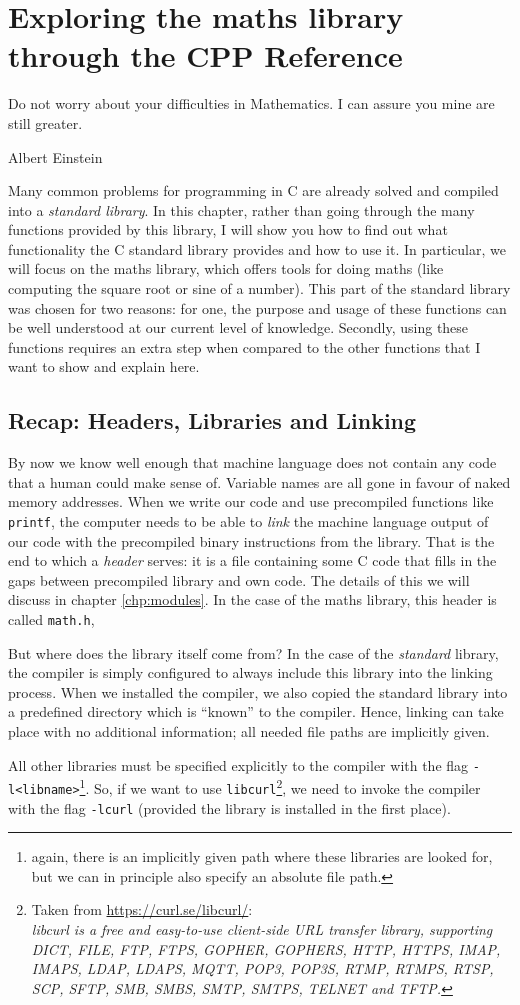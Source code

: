 \chapter{Exploring the maths library through the CPP Reference}\label{chp:maths}
\epigraph{Do not worry about your difficulties in Mathematics. I can assure you mine are still greater.}{Albert Einstein}

Many common problems for programming in C are already solved and compiled into a \emph{standard library}. In this chapter, rather than going through the many functions provided by this library, I will show you how to find out what functionality the C standard library provides and how to use it. In particular, we will focus on the maths library, which offers tools for doing maths (like computing the square root or sine of a number). This part of the standard library was chosen for two reasons: for one, the purpose and usage of these functions can be well understood at our current level of knowledge. Secondly, using these functions requires an extra step when compared to the other functions that I want to show and explain here.

\section{Recap: Headers, Libraries and Linking}
By now we know well enough that machine language does not contain any code that a human could make sense of. Variable names are all gone in favour of naked memory addresses. When we write our code and use precompiled functions like \texttt{printf}, the computer needs to be able to \emph{link} the machine language output of our code with the precompiled binary instructions from the library. That is the end to which a \emph{header} serves: it is a file containing some C code that fills in the gaps between precompiled library and own code. The details of this we will discuss in chapter \ref{chp:modules}. In the case of the maths library, this header is called \texttt{math.h},

But where does the library itself come from? In the case of the \emph{standard} library, the compiler is simply configured to always include this library into the linking process. When we installed the compiler, we also copied the standard library into a  predefined directory which is \enquote{known} to the compiler. Hence, linking can take place with no additional information; all needed file paths are implicitly given.

All other libraries must be specified explicitly to the compiler with the flag \texttt{-l<libname>}\footnote{again, there is an implicitly given path where these libraries are looked for, but we can in principle also specify an absolute file path.}. So, if we want to use \texttt{libcurl}\footnote{Taken from \url{https://curl.se/libcurl/}:\\
\emph{libcurl is a free and easy-to-use client-side URL transfer library, supporting DICT, FILE, FTP, FTPS, GOPHER, GOPHERS, HTTP, HTTPS, IMAP, IMAPS, LDAP, LDAPS, MQTT, POP3, POP3S, RTMP, RTMPS, RTSP, SCP, SFTP, SMB, SMBS, SMTP, SMTPS, TELNET and TFTP.}}, we need to invoke the compiler with the flag \texttt{-lcurl} (provided the library is installed in the first place).

